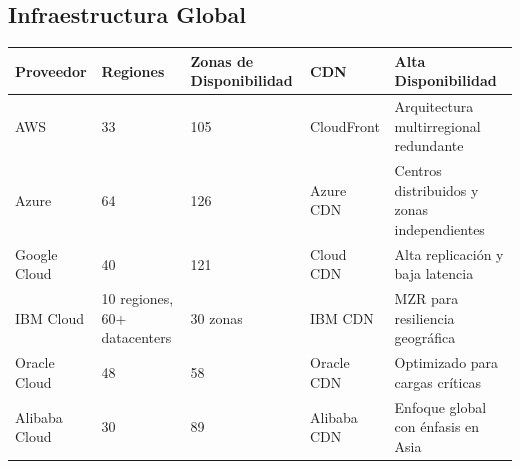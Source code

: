 {        \subsection{Infraestructura Global}
            \begin{tabularx}{\linewidth}{|X|X|X|X|X|}
                \hline
                \textbf{Proveedor} & \textbf{Regiones} & \textbf{Zonas de Disponibilidad} & \textbf{CDN} & \textbf{Alta Disponibilidad} \\
                \hline
                AWS & 33 & 105 & CloudFront & Arquitectura multirregional redundante \\
                \hline
                Azure & 64 & 126 & Azure CDN & Centros distribuidos y zonas independientes \\
                \hline
                Google Cloud & 40 & 121 & Cloud CDN & Alta replicación y baja latencia \\
                \hline
                IBM Cloud & 10 regiones, 60+ datacenters & 30 zonas & IBM CDN & MZR para resiliencia geográfica \\
                \hline
                Oracle Cloud & 48 & 58 & Oracle CDN & Optimizado para cargas críticas \\
                \hline
                Alibaba Cloud & 30 & 89 & Alibaba CDN & Enfoque global con énfasis en Asia \\
                \hline
            \end{tabularx}
    
        \begin{landscape}    

\end{landscape}}
